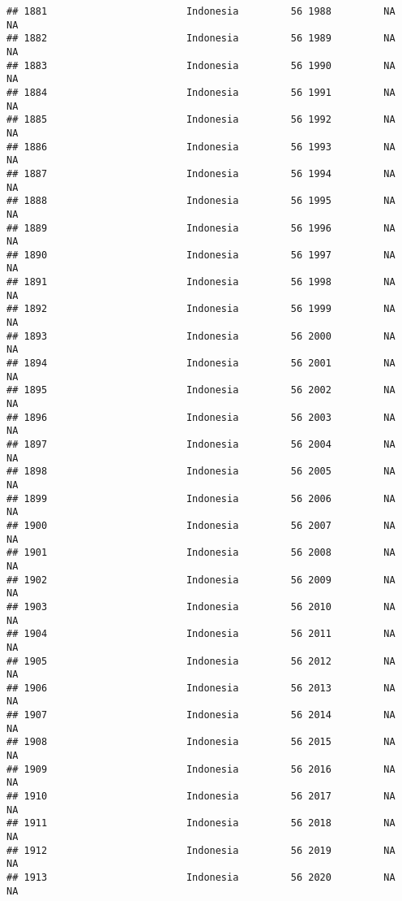\documentclass[
]{article}
\begin{document}
\begin{verbatim}
## 1881                        Indonesia         56 1988         NA         NA
## 1882                        Indonesia         56 1989         NA         NA
## 1883                        Indonesia         56 1990         NA         NA
## 1884                        Indonesia         56 1991         NA         NA
## 1885                        Indonesia         56 1992         NA         NA
## 1886                        Indonesia         56 1993         NA         NA
## 1887                        Indonesia         56 1994         NA         NA
## 1888                        Indonesia         56 1995         NA         NA
## 1889                        Indonesia         56 1996         NA         NA
## 1890                        Indonesia         56 1997         NA         NA
## 1891                        Indonesia         56 1998         NA         NA
## 1892                        Indonesia         56 1999         NA         NA
## 1893                        Indonesia         56 2000         NA         NA
## 1894                        Indonesia         56 2001         NA         NA
## 1895                        Indonesia         56 2002         NA         NA
## 1896                        Indonesia         56 2003         NA         NA
## 1897                        Indonesia         56 2004         NA         NA
## 1898                        Indonesia         56 2005         NA         NA
## 1899                        Indonesia         56 2006         NA         NA
## 1900                        Indonesia         56 2007         NA         NA
## 1901                        Indonesia         56 2008         NA         NA
## 1902                        Indonesia         56 2009         NA         NA
## 1903                        Indonesia         56 2010         NA         NA
## 1904                        Indonesia         56 2011         NA         NA
## 1905                        Indonesia         56 2012         NA         NA
## 1906                        Indonesia         56 2013         NA         NA
## 1907                        Indonesia         56 2014         NA         NA
## 1908                        Indonesia         56 2015         NA         NA
## 1909                        Indonesia         56 2016         NA         NA
## 1910                        Indonesia         56 2017         NA         NA
## 1911                        Indonesia         56 2018         NA         NA
## 1912                        Indonesia         56 2019         NA         NA
## 1913                        Indonesia         56 2020         NA         NA

\end{verbatim}
\end{document}
